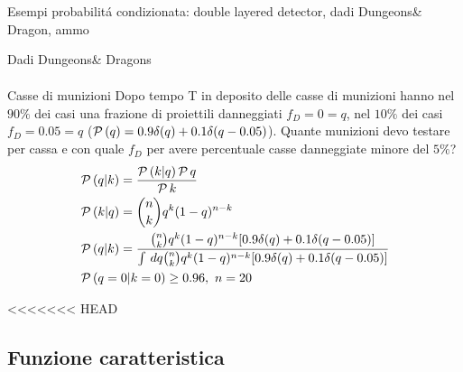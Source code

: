 \begin{frame}[allowframebreaks]{Esempi probabilit\'a condizionata: double layered detector, dadi Dungeons\& Dragon, ammo}
\begin{block}{Dadi Dungeons\& Dragons}
\begin{align*}
\end{align*}
\end{block}
\begin{block}{Casse di munizioni}
Dopo tempo T in deposito delle casse di munizioni hanno nel $90\%$ dei casi una frazione di proiettili danneggiati $f_D=0=q$, nel $10\%$ dei casi $f_D=0.05=q$ ($\operatorname{\mathcal{P}}{(q)}=0.9\delta(q)+0.1\delta(q-0.05)$). Quante munizioni devo testare per cassa e con quale $f_D$ per avere percentuale casse danneggiate minore del $5\%$?
\begin{align*}
&\operatorname{\mathcal{P}}{(q|k)}=\frac{\operatorname{\mathcal{P}}{(k|q)}\operatorname{\mathcal{P}}{q}}{\operatorname{\mathcal{P}}{k}}\\
&\operatorname{\mathcal{P}}{(k|q)}=\binom{n}{k}q^k(1-q)^{n-k}\\
&\operatorname{\mathcal{P}}{(q|k)}=\frac{\binom{n}{k}q^k(1-q)^{n-k}[0.9\delta(q)+0.1\delta(q-0.05)]}{\int\,dq\binom{n}{k}q^k(1-q)^{n-k}[0.9\delta(q)+0.1\delta(q-0.05)]}\\
&\operatorname{\mathcal{P}}{(q=0|k=0)}\geq0.96,\ n=20
\end{align*}
\end{block}
\end{frame}

<<<<<<< HEAD
\subsection{Funzione caratteristica}


